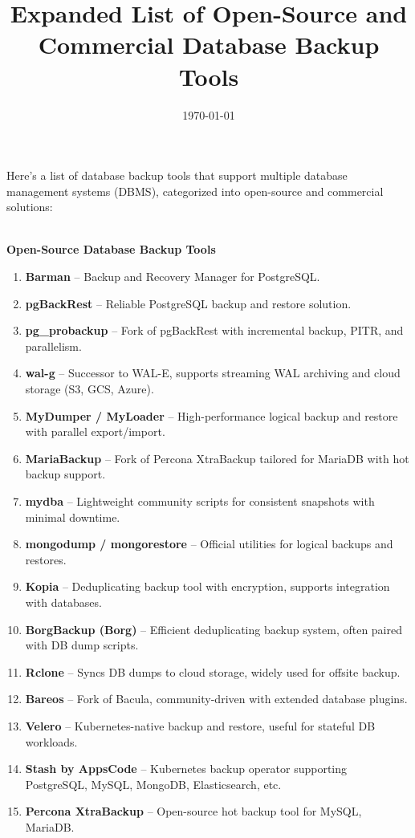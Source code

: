 \documentclass[12pt]{article}
\title{Expanded List of Open-Source and Commercial Database Backup Tools}
\author{}
\date{\today}
\begin{document}
\maketitle

Here’s a list of database backup tools that support multiple database management systems (DBMS), categorized into open-source and commercial solutions:

\textbf{\\Open-Source Database Backup Tools}

\begin{enumerate}
    \item \textbf{Barman} -- Backup and Recovery Manager for PostgreSQL.
    \item \textbf{pgBackRest} -- Reliable PostgreSQL backup and restore solution.
    \item \textbf{pg\_probackup} -- Fork of pgBackRest with incremental backup, PITR, and parallelism.
    \item \textbf{wal-g} -- Successor to WAL-E, supports streaming WAL archiving and cloud storage (S3, GCS, Azure).
    \item \textbf{MyDumper / MyLoader} -- High-performance logical backup and restore with parallel export/import.
    \item \textbf{MariaBackup} -- Fork of Percona XtraBackup tailored for MariaDB with hot backup support.
    \item \textbf{mydba} -- Lightweight community scripts for consistent snapshots with minimal downtime.
    \item \textbf{mongodump / mongorestore} -- Official utilities for logical backups and restores.
    \item \textbf{Kopia} -- Deduplicating backup tool with encryption, supports integration with databases.
    \item \textbf{BorgBackup (Borg)} -- Efficient deduplicating backup system, often paired with DB dump scripts.
    \item \textbf{Rclone} -- Syncs DB dumps to cloud storage, widely used for offsite backup.
    \item \textbf{Bareos} -- Fork of Bacula, community-driven with extended database plugins.
    \item \textbf{Velero} -- Kubernetes-native backup and restore, useful for stateful DB workloads.
    \item \textbf{Stash by AppsCode} -- Kubernetes backup operator supporting PostgreSQL, MySQL, MongoDB, Elasticsearch, etc.
    \item \textbf{Percona XtraBackup} -- Open-source hot backup tool for MySQL, MariaDB.

\end{enumerate}
\end{document}
